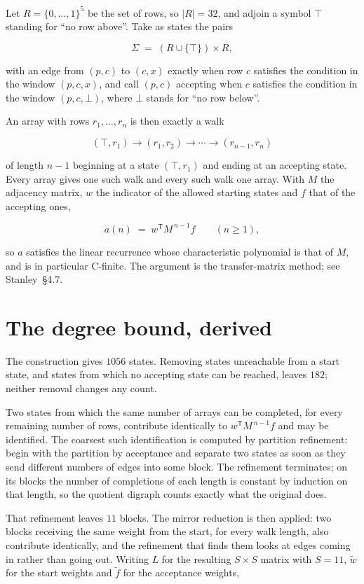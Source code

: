 \documentclass[11pt]{article}
\theoremstyle{definition}
\begin{document}
Let $R = \{0,\dots,1\}^{5}$ be the set of rows, so $|R| = 32$, and adjoin a symbol $\top$ standing for ``no row above''. Take as states the pairs

\[\Sigma \;=\; (R \cup \{\top\}) \times R,\]

with an edge from $(p,c)$ to $(c,x)$ exactly when row $c$ satisfies the condition in the window $(p,c,x)$, and call $(p,c)$ accepting when $c$ satisfies the condition in the window $(p,c,\bot)$, where $\bot$ stands for ``no row below''.

An array with rows $r_1,\dots,r_n$ is then exactly a walk

\[(\top,r_1) \to (r_1,r_2) \to \cdots \to (r_{n-1},r_n)\]

of length $n-1$ beginning at a state $(\top,r_1)$ and ending at an accepting state. Every array gives one such walk and every such walk one array. With $M$ the adjacency matrix, $w$ the indicator of the allowed starting states and $f$ that of the accepting ones,

\[a(n) \;=\; w^{\mathsf T} M^{\,n-1} f \qquad (n \ge 1),\]

so $a$ satisfies the linear recurrence whose characteristic polynomial is that of $M$, and is in particular C-finite. The argument is the transfer-matrix method; see Stanley~\S4.7.

\section{The degree bound, derived}

The construction gives $1056$ states. Removing states unreachable from a start state, and states from which no accepting state can be reached, leaves $182$; neither removal changes any count.

Two states from which the same number of arrays can be completed, for every remaining number of rows, contribute identically to $w^{\mathsf T}M^{\,n-1}f$ and may be identified. The coarsest such identification is computed by partition refinement: begin with the partition by acceptance and separate two states as soon as they send different numbers of edges into some block. The refinement terminates; on its blocks the number of completions of each length is constant by induction on that length, so the quotient digraph counts exactly what the original does.

That refinement leaves $11$ blocks. The mirror reduction is then applied: two blocks receiving the same weight from the start, for every walk length, also contribute identically, and the refinement that finds them looks at edges coming in rather than going out. Writing $L$ for the resulting $S \times S$ matrix with $S = 11$, $\tilde w$ for the start weights and $\tilde f$ for the acceptance weights,
\end{document}
